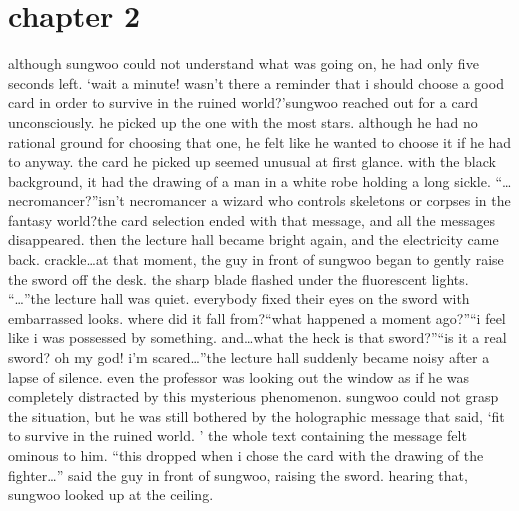 \section{chapter 2}






although sungwoo could not understand what was going on, he had only five seconds left.
‘wait a minute! wasn’t there a reminder that i should choose a good card in order to survive in the ruined world?’sungwoo reached out for a card unconsciously.
 he picked up the one with the most stars.
 although he had no rational ground for choosing that one, he felt like he wanted to choose it if he had to anyway.
the card he picked up seemed unusual at first glance.
 with the black background, it had the drawing of a man in a white robe holding a long sickle.
“…necromancer?”isn’t necromancer a wizard who controls skeletons or corpses in the fantasy world?the card selection ended with that message, and all the messages disappeared.
then the lecture hall became bright again, and the electricity came back.
crackle…at that moment, the guy in front of sungwoo began to gently raise the sword off the desk.
 the sharp blade flashed under the fluorescent lights.
“…”the lecture hall was quiet.
 everybody fixed their eyes on the sword with embarrassed looks.
 where did it fall from?“what happened a moment ago?”“i feel like i was possessed by something.
 and…what the heck is that sword?”“is it a real sword? oh my god! i’m scared…”the lecture hall suddenly became noisy after a lapse of silence.
 even the professor was looking out the window as if he was completely distracted by this mysterious phenomenon.
sungwoo could not grasp the situation, but he was still bothered by the holographic message that said, ‘fit to survive in the ruined world.
’ the whole text containing the message felt ominous to him.
“this dropped when i chose the card with the drawing of the fighter…” said the guy in front of sungwoo, raising the sword.
 hearing that, sungwoo looked up at the ceiling.

